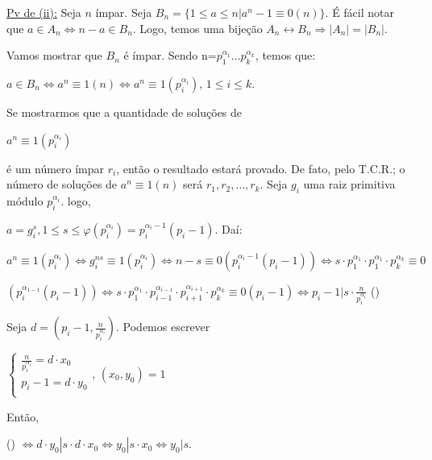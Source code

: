 \documentclass[a4paper,12pt]{article}
\renewcommand{\phi}{\ensuremath{\varphi}}
\renewcommand{\leq}{\ensuremath{\leqslant}}
\theoremstyle{plain} %
\theoremstyle{definition} %
\theoremstyle{remark} %
\begin{document}
\begin{framed}
		\underline{Pv de (ii):} Seja $n$ \'impar. Seja $B_n=\{1\leq a\leq n|a^n-1\equiv0(n)\}$. \'E f\'acil notar que $a\in A_n\Leftrightarrow n-a\in B_n$. Logo, temos uma bije\c{c}\~ao $A_n\leftrightarrow B_n\Rightarrow |A_n|=|B_n|$.
		
		Vamos mostrar que $B_n$ \'e \'impar. Sendo n=$p_1^{\alpha_1} \dotso p_k^{\alpha_k}$, temos que:
		
		\begin{center}
			$a\in B_n\Leftrightarrow a^n\equiv1(n)\Leftrightarrow a^n\equiv 1(p_i^{\alpha_i})$, $1\leq i\leq k$.
		\end{center}
		
		Se mostrarmos que a quantidade de solu\c{c}\~oes de
		
		\begin{center}
			$a^n\equiv 1(p_i^{\alpha_i})$
		\end{center}
		
		\'e um n\'umero \'impar $r_i$, ent\~ao o resultado estar\'a provado. De fato, pelo T.C.R.; o n\'umero de solu\c{c}\~oes de $a^n\equiv 1(n)$ ser\'a $r_1, r_2, \dotso, r_k$. Seja $g_i$ uma raiz primitiva m\'odulo $p_i^{\alpha_i}$. logo,
		
		$a=g_i^s, 1\leq s\leq \phi(p_i^{\alpha_i})=p_i^{\alpha_i-1}(p_i-1)$. Da\'i:
		
		$a^n\equiv 1(p_i^{\alpha_i})\Leftrightarrow g_i^{ns}\equiv 1(p_i^{\alpha_i})\Leftrightarrow n-s\equiv0(p_i^{\alpha_i-1}(p_i-1))\Leftrightarrow s\cdot p_1^{\alpha_1}\cdot p_1^{\alpha_1} \cdot p_k^{\alpha_k}\equiv0$
		
		$(p_i^{\alpha_{1-1}}(p_i-1))\Leftrightarrow s\cdot p_1^{\alpha_1}\cdot p_{i-1}^{\alpha_{i-1}}\cdot p_{i+1}^{\alpha_{i+1}}\cdot  p_k^{\alpha_k}\equiv0(p_i-1)\Leftrightarrow p_i-1|s\cdot\displaystyle\frac{n}{p_i^{\alpha_i}}$ (\textasteriskcentered)
		
		Seja $d=(p_i-1, \frac{n}{p_i^{\alpha_i}})$. Podemos escrever
		
		$\left\{
		\begin{array}{lc}
			\displaystyle\frac{n}{p_i^{\alpha_i}}=d\cdot x_0\\
			p_i-1=d\cdot y_0\\
		\end{array}
		\right.$, $(x_0, y_0)=1$
		\vspace{1em}
		
		Ent\~ao,
		
		(\textasteriskcentered) $\Leftrightarrow d\cdot y_0|s\cdot d\cdot x_0\Leftrightarrow y_0|s\cdot x_0 \Leftrightarrow y_0|s$.
		

\end{framed}
\end{document}
